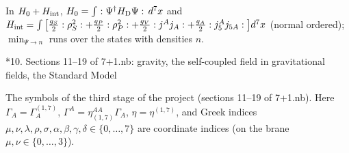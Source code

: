 \documentclass[10pt,a4paper]{article}
\makeatletter
\renewcommand\section{\@startsection{section}{1}{\z@}{-3.5ex \@plus -1ex \@minus -.2ex}{2.3ex \@plus.2ex}{\normalfont\Large\bfseries\raggedright}}
\makeatother
\begin{document}
In $H_0+H_{\rm int}$, $H_0=\int:\Psi^\dagger H_{\rm D}\Psi:\,d^7x$ and $H_{\rm int}=\int\big[\frac{g_S}2:\rho_S^2:+\frac{g_P}2:\rho_P^2:+\frac{g_V}2:j^Aj_A:+\frac{g_A}2:j_5^Aj_{5A}:\big]d^7x$ (normal ordered); $\min_{\Psi\to n}$ runs over the states with densities $n$.

\section*{10. Sections 11–19 of 7+1.nb: gravity, the self-coupled field in gravitational fields, the Standard Model}
The symbols of the third stage of the project (sections 11–19 of 7+1.nb). Here $\Gamma_A=\Gamma^{(1,7)}_A$, $\Gamma^A=\eta_{(1,7)}^{AA}\Gamma_A$, $\eta=\eta^{(1,7)}$, and Greek indices $\mu,\nu,\lambda,\rho,\sigma,\alpha,\beta,\gamma,\delta\in\lbrace0,\dots,7\rbrace$ are coordinate indices (on the brane $\mu,\nu\in\lbrace0,\dots,3\rbrace$).
\end{document}
